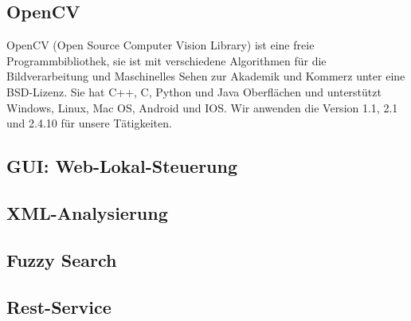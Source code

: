 \documentclass[10pt,a4paper]{report}
\begin{document}
\subsection{OpenCV}
OpenCV (Open Source Computer Vision Library) ist eine freie Programmbibliothek, sie ist mit verschiedene Algorithmen für die Bildverarbeitung und Maschinelles Sehen zur Akademik und Kommerz unter eine BSD-Lizenz. Sie hat C++, C, Python und Java Oberflächen und unterstützt Windows, Linux, Mac OS, Android und IOS. Wir anwenden die Version 1.1, 2.1 und 2.4.10 für unsere Tätigkeiten.
\subsection{GUI: Web-Lokal-Steuerung}


\subsection{XML-Analysierung}

\subsection{Fuzzy Search}

\subsection{Rest-Service}
\end{document}
